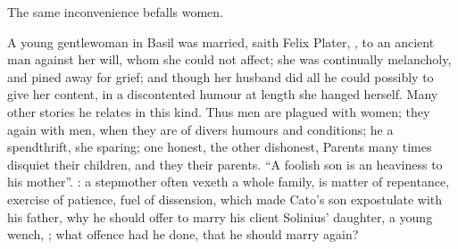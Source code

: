 The same inconvenience befalls women.


A young gentlewoman in Basil was married, saith Felix
Plater, , to an ancient man against her
will, whom she could not affect; she was continually melancholy, and pined away
for grief; and though her husband did all he could possibly to give her
content, in a discontented humour at length she hanged herself. Many other
stories he relates in this kind. Thus men are plagued with women; they again
with men, when they are of divers humours and conditions; he a spendthrift, she
sparing; one honest, the other dishonest, \etc{} Parents many times disquiet
their children, and they their parents. \enquote{A foolish son is
an heaviness to his mother}. : a stepmother often vexeth a
whole family, is matter of repentance, exercise of patience, fuel of
dissension, which made Cato's son expostulate with his father, why he should
offer to marry his client Solinius' daughter, a young wench, ; what offence had he done, that he should marry again?

